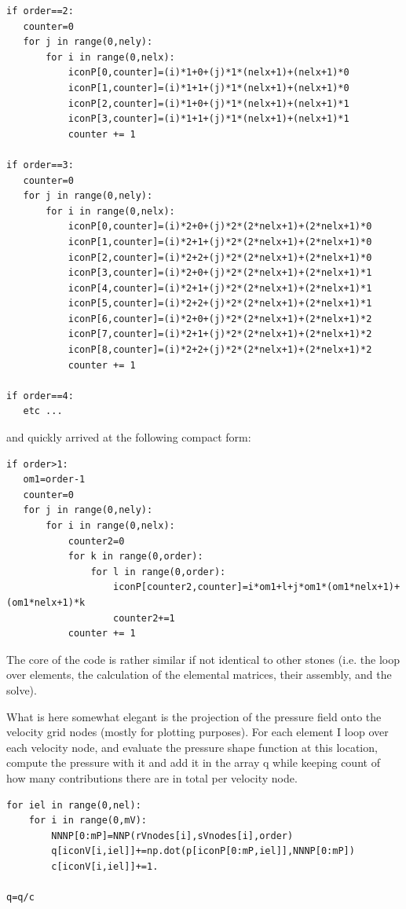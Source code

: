 \begin{lstlisting}
if order==2:
   counter=0
   for j in range(0,nely):
       for i in range(0,nelx):
           iconP[0,counter]=(i)*1+0+(j)*1*(nelx+1)+(nelx+1)*0 
           iconP[1,counter]=(i)*1+1+(j)*1*(nelx+1)+(nelx+1)*0 
           iconP[2,counter]=(i)*1+0+(j)*1*(nelx+1)+(nelx+1)*1 
           iconP[3,counter]=(i)*1+1+(j)*1*(nelx+1)+(nelx+1)*1 
           counter += 1

if order==3:
   counter=0
   for j in range(0,nely):
       for i in range(0,nelx):
           iconP[0,counter]=(i)*2+0+(j)*2*(2*nelx+1)+(2*nelx+1)*0 
           iconP[1,counter]=(i)*2+1+(j)*2*(2*nelx+1)+(2*nelx+1)*0 
           iconP[2,counter]=(i)*2+2+(j)*2*(2*nelx+1)+(2*nelx+1)*0 
           iconP[3,counter]=(i)*2+0+(j)*2*(2*nelx+1)+(2*nelx+1)*1 
           iconP[4,counter]=(i)*2+1+(j)*2*(2*nelx+1)+(2*nelx+1)*1 
           iconP[5,counter]=(i)*2+2+(j)*2*(2*nelx+1)+(2*nelx+1)*1 
           iconP[6,counter]=(i)*2+0+(j)*2*(2*nelx+1)+(2*nelx+1)*2 
           iconP[7,counter]=(i)*2+1+(j)*2*(2*nelx+1)+(2*nelx+1)*2 
           iconP[8,counter]=(i)*2+2+(j)*2*(2*nelx+1)+(2*nelx+1)*2 
           counter += 1

if order==4:
   etc ...
\end{lstlisting}
and quickly arrived at the following compact form:
\begin{lstlisting}
if order>1:
   om1=order-1
   counter=0
   for j in range(0,nely):
       for i in range(0,nelx):
           counter2=0
           for k in range(0,order):
               for l in range(0,order):
                   iconP[counter2,counter]=i*om1+l+j*om1*(om1*nelx+1)+(om1*nelx+1)*k 
                   counter2+=1
           counter += 1
\end{lstlisting}

The core of the code is rather similar if not identical to other stones (i.e.
the loop over elements, the calculation of the elemental matrices, their assembly, 
and the solve).

What is here somewhat elegant is the projection of the pressure field onto the 
velocity grid nodes (mostly for plotting purposes). 
For each element I loop over each velocity node, and evaluate the 
pressure shape function at this location, compute the pressure with it 
and add it in the array q while keeping count of how many 
contributions there are in total per velocity node. 

\begin{lstlisting}
for iel in range(0,nel):
    for i in range(0,mV):
        NNNP[0:mP]=NNP(rVnodes[i],sVnodes[i],order)
        q[iconV[i,iel]]+=np.dot(p[iconP[0:mP,iel]],NNNP[0:mP])
        c[iconV[i,iel]]+=1.

q=q/c
\end{lstlisting}

